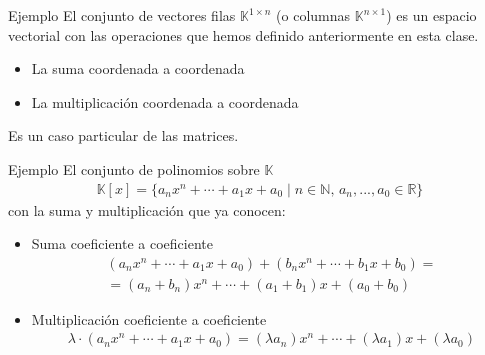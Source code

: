 \documentclass[handout]{beamer} %
\newcommand{\R}{\mathbb R}
\newcommand{\K}{\mathbb K}
\newcommand{\N}{\mathbb N}
\begin{document}
\begin{frame}

\begin{block}{Ejemplo}
El conjunto de vectores filas $\K^{1\times n}$  (o columnas $\K^{n\times 1}$) es un espacio vectorial con las operaciones que hemos definido anteriormente en esta clase.\pause
\begin{itemize}
    \item La suma coordenada a coordenada
    \item La multiplicación coordenada a coordenada
\end{itemize}



\end{block}
\pause
\begin{block}{}
Es un caso particular de las matrices. 
\end{block}

    
\end{frame}



\begin{frame}

\begin{block}{Ejemplo}
El conjunto de polinomios sobre $\K$
\begin{align*}
\K[x]=\{a_nx^n+\cdots +a_1 x+a_0\mid n\in\N,\, a_n, ..., a_0\in\R\} 
\end{align*}
con la suma y multiplicación que ya conocen:\pause
\end{block}

\begin{block}{}
\begin{itemize}
    \item Suma coeficiente a coeficiente
    \begin{multline*}
    (a_nx^n+\cdots +a_1 x+a_0)+(b_nx^n+\cdots +b_1 x+b_0)=\\
    = (a_n+b_n)x^n+\cdots +(a_1+b_1) x+(a_0+b_0)
    \end{multline*}

    \pause

    \item Multiplicación coeficiente a coeficiente
    \begin{multline*}
    \lambda\cdot (a_nx^n+\cdots +a_1 x+a_0)
    =(\lambda a_n)x^n+\cdots +(\lambda a_1) x+(\lambda a_0)
    \end{multline*}
\end{itemize}
    
\end{block}

    
\end{frame}
\end{document}
